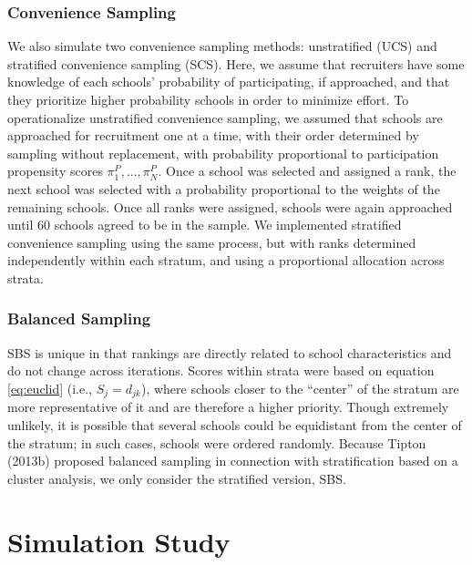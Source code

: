 \documentclass[man,floatsintext]{apa6}
\begin{document}
\hypertarget{convenience-sampling}{%
\subsubsection{Convenience Sampling}\label{convenience-sampling}}

We also simulate two convenience sampling methods: unstratified (UCS) and stratified convenience sampling (SCS). Here, we assume that recruiters have some knowledge of each schools' probability of participating, if approached, and that they prioritize higher probability schools in order to minimize effort.
To operationalize unstratified convenience sampling, we assumed that schools are approached for recruitment one at a time, with their order determined by sampling without replacement, with probability proportional to participation propensity scores \(\pi^P_1,...,\pi^P_N\).
Once a school was selected and assigned a rank, the next school was selected with a probability proportional to the weights of the remaining schools. Once all ranks were assigned, schools were again approached until 60 schools agreed to be in the sample.
We implemented stratified convenience sampling using the same process, but with ranks determined independently within each stratum, and using a proportional allocation across strata.

\hypertarget{balanced-sampling-1}{%
\subsubsection{Balanced Sampling}\label{balanced-sampling-1}}

SBS is unique in that rankings are directly related to school characteristics and do not change across iterations. Scores within strata were based on equation \eqref{eq:euclid} (i.e., \(S_j = d_{jk}\)), where schools closer to the \enquote{center} of the stratum are more representative of it and are therefore a higher priority. Though extremely unlikely, it is possible that several schools could be equidistant from the center of the stratum; in such cases, schools were ordered randomly.
Because Tipton (2013b) proposed balanced sampling in connection with stratification based on a cluster analysis, we only consider the stratified version, SBS.

\hypertarget{simulation-study}{%
\section{Simulation Study}\label{simulation-study}}
\end{document}
